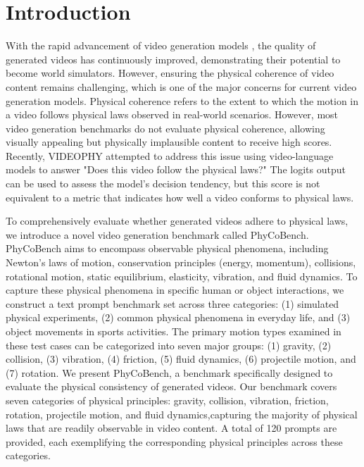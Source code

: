 \section{Introduction}
With the rapid advancement of video generation models \cite{animatediff, dynamicrafter, text2video, tuneavideo, videocrafter1, videocrafter2}, the quality of generated videos has continuously improved, demonstrating their potential to become world simulators. However, ensuring the physical coherence of video content remains challenging, which is one of the major concerns for current video generation models. Physical coherence refers to the extent to which the motion in a video follows physical laws observed in real-world scenarios. However, most video generation benchmarks \cite{2024vbench, evalcrafter, t2vbench} do not evaluate physical coherence, allowing visually appealing but physically implausible content to receive high scores. Recently, VIDEOPHY \cite{videophy} attempted to address this issue using video-language models to answer "Does this video follow the physical laws?" The logits output can be used to assess the model's decision tendency, but this score is not equivalent to a metric that indicates how well a video conforms to physical laws.


To comprehensively evaluate whether generated videos adhere to physical laws, we introduce a novel video generation benchmark called PhyCoBench. PhyCoBench aims to encompass observable physical phenomena, including Newton's laws of motion, conservation principles (energy, momentum), collisions, rotational motion, static equilibrium, elasticity, vibration, and fluid dynamics. To capture these physical phenomena in specific human or object interactions, we construct a text prompt benchmark set across three categories: (1) simulated physical experiments, (2) common physical phenomena in everyday life, and (3) object movements in sports activities. The primary motion types examined in these test cases can be categorized into seven major groups: (1) gravity, (2) collision, (3) vibration, (4) friction, (5) fluid dynamics, (6) projectile motion, and (7) rotation.
We present PhyCoBench, a benchmark specifically designed to evaluate the physical consistency of generated videos. Our benchmark covers seven categories of physical principles: gravity, collision, vibration, friction, rotation, projectile motion, and fluid dynamics,capturing the majority of physical laws that are readily observable in video content. A total of 120 prompts are provided, each exemplifying the corresponding physical principles across these categories.

